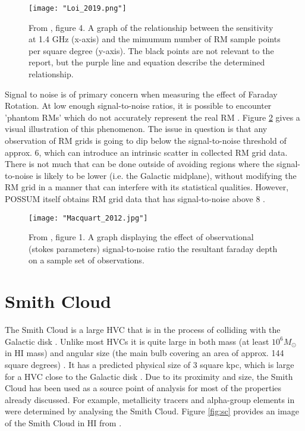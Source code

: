 \begin{figure}
    \texttt{[image: "Loi\_2019.png"]}
    \centering
    \caption{From \cite{ID59}, figure 4. A graph of the relationship between the sensitivity at 1.4 GHz (x-axis) and the mimumum number of RM sample points per square degree (y-axis). The black points are not relevant to the report, but the purple line and equation describe the determined relationship.}
    \label{fig:loi}
\end{figure}

Signal to noise is of primary concern when measuring the effect of Faraday Rotation. At low enough signal-to-noise ratios, it is possible to encounter 'phantom RMs' which do not accurately represent the real RM \citep{ID60}. Figure \ref{fig:snr} gives a visual illustration of this phenomenon. The issue in question is that any observation of RM grids is going to dip below the signal-to-noise threshold of approx. 6, which can introduce an intrinsic scatter in collected RM grid data. There is not much that can be done outside of avoiding regions where the signal-to-noise is likely to be lower (i.e. the Galactic midplane), without modifying the RM grid in a manner that can interfere with its statistical qualities. However, POSSUM itself obtains RM grid data that has signal-to-noise above 8 \citep{ID71}.

\begin{figure}
    \texttt{[image: "Macquart\_2012.jpg"]}
    \centering
    \caption{From \cite{ID60}, figure 1. A graph displaying the effect of observational (stokes parameters) signal-to-noise ratio the resultant faraday depth on a sample set of observations.}
    \label{fig:snr}
\end{figure}

\section{Smith Cloud}
\label{sec:sc}

The Smith Cloud is a large HVC that is in the process of colliding with the Galactic disk \citep{ID28, ID64, ID35}. Unlike most HVCs it is quite large in both mass (at least $10^6 M_{\odot}$ in HI mass) and angular size (the main bulb covering an area of approx. 144 square degrees) \citep{ID28, ID64, ID35}. It has a predicted physical size of 3 square kpc, which is large for a HVC close to the Galactic disk \citep{ID28}. Due to its proximity and size, the Smith Cloud has been used as a source point of analysis for most of the properties already discussed. For example, metallicity tracers and alpha-group elements in \cite{ID48, ID49} were determined by analysing the Smith Cloud. Figure \ref{fig:sc} provides an image of the Smith Cloud in HI from \cite{ID28}.

